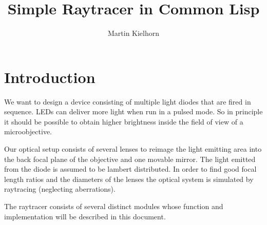 \documentclass[columns=2]{scrartcl}
\title{Simple Raytracer in Common Lisp}
\author{Martin Kielhorn}
\begin{document}
\maketitle
\section{Introduction}
We want to design a device consisting of multiple light diodes that
are fired in sequence. LEDs can deliver more light when run in a
pulsed mode. So in principle it should be possible to obtain higher
brightness inside the field of view of a microobjective.

Our optical setup consists of several lenses to reimage the light
emitting area into the back focal plane of the objective and one
movable mirror. The light emitted from the diode is assumed to be
lambert distributed. In order to find good focal length ratios and the
diameters of the lenses the optical system is simulated by raytracing
(neglecting aberrations).

The raytracer consists of several distinct modules whose function and
implementation will be described in this document.
\end{document}
